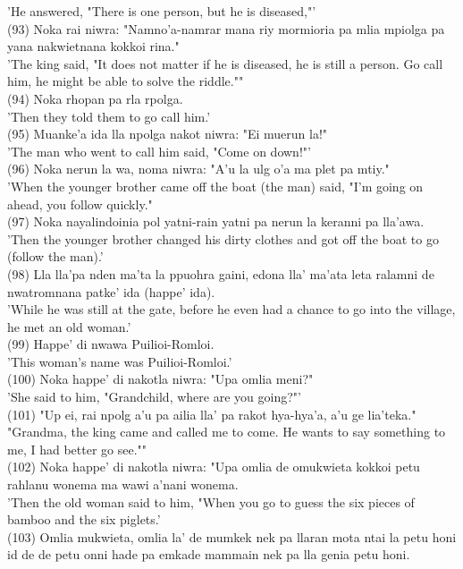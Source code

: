 \documentclass[10pt]{article}
\begin{document}
'He answered, "There is one person, but he is diseased,"'\\
(93) Noka rai niwra: "Namno'a-namrar mana riy mormioria pa mlia mpiolga pa yana nakwietnana kokkoi rina."\\
'The king said, "It does not matter if he is diseased, he is still a person. Go call him, he might be able to solve the riddle.""\\
(94) Noka rhopan pa rla rpolga.\\
'Then they told them to go call him.'\\
(95) Muanke'a ida lla npolga nakot niwra: "Ei muerun la!"\\
'The man who went to call him said, "Come on down!"'\\
(96) Noka nerun la wa, noma niwra: "A'u la ulg o'a ma plet pa mtiy."\\
'When the younger brother came off the boat (the man) said, "I'm going on ahead, you follow quickly."\\
(97) Noka nayalindoinia pol yatni-rain yatni pa nerun la keranni pa lla'awa.\\
'Then the younger brother changed his dirty clothes and got off the boat to go (follow the man).'\\
(98) Lla lla'pa nden ma'ta la ppuohra gaini, edona lla' ma'ata leta ralamni de nwatromnana patke' ida (happe' ida).\\
'While he was still at the gate, before he even had a chance to go into the village, he met an old woman.'\\
(99) Happe' di nwawa Puilioi-Romloi.\\
'This woman's name was Puilioi-Romloi.'\\
(100) Noka happe' di nakotla niwra: "Upa omlia meni?"\\
'She said to him, "Grandchild, where are you going?"'\\
(101) "Up ei, rai npolg a'u pa ailia lla' pa rakot hya-hya'a, a'u ge lia'teka."\\
"Grandma, the king came and called me to come. He wants to say something to me, I had better go see.""\\
(102) Noka happe' di nakotla niwra: "Upa omlia de omukwieta kokkoi petu rahlanu wonema ma wawi a'nani wonema.\\
'Then the old woman said to him, "When you go to guess the six pieces of bamboo and the six piglets.'\\
(103) Omlia mukwieta, omlia la' de mumkek nek pa llaran mota ntai la petu honi id de de petu onni hade pa emkade mammain nek pa lla genia petu honi.\\
\end{document}
